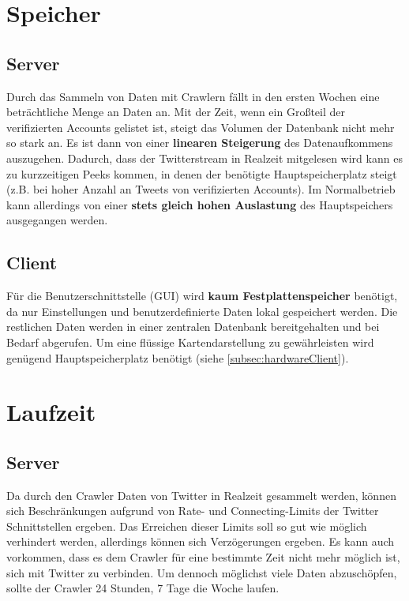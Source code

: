 \section{Speicher}
\subsection{Server}
Durch das Sammeln von Daten mit Crawlern fällt in den ersten Wochen eine beträchtliche Menge an Daten an. Mit der Zeit, wenn ein Großteil der verifizierten Accounts gelistet ist, steigt das Volumen der Datenbank nicht mehr so stark an. Es ist dann von einer \textbf{linearen Steigerung} des Datenaufkommens auszugehen. 
Dadurch, dass der Twitterstream in Realzeit mitgelesen wird kann es zu  kurzzeitigen Peeks kommen, in denen der benötigte Hauptspeicherplatz steigt (z.B. bei hoher Anzahl an Tweets von verifizierten Accounts). Im Normalbetrieb kann allerdings von einer \textbf{stets gleich hohen Auslastung} des Hauptspeichers ausgegangen werden.
\subsection{Client}
Für die Benutzerschnittstelle (GUI) wird \textbf{kaum Festplattenspeicher} benötigt, da nur Einstellungen und benutzerdefinierte Daten lokal gespeichert werden. Die restlichen Daten werden in einer zentralen Datenbank bereitgehalten und bei Bedarf abgerufen.
Um eine flüssige Kartendarstellung zu gewährleisten wird genügend Hauptspeicherplatz benötigt (siehe \ref{subsec:hardwareClient}).
\section{Laufzeit}
\subsection{Server}
Da durch den Crawler Daten von Twitter in Realzeit gesammelt werden, können sich Beschränkungen aufgrund von Rate- und Connecting-Limits der Twitter Schnittstellen ergeben. Das Erreichen dieser Limits soll so gut wie möglich verhindert werden, allerdings können sich Verzögerungen ergeben. Es kann auch vorkommen, dass es dem Crawler für eine bestimmte Zeit nicht mehr möglich ist, sich mit Twitter zu verbinden. Um dennoch möglichst viele Daten abzuschöpfen, sollte der Crawler 24 Stunden, 7 Tage die Woche laufen.
